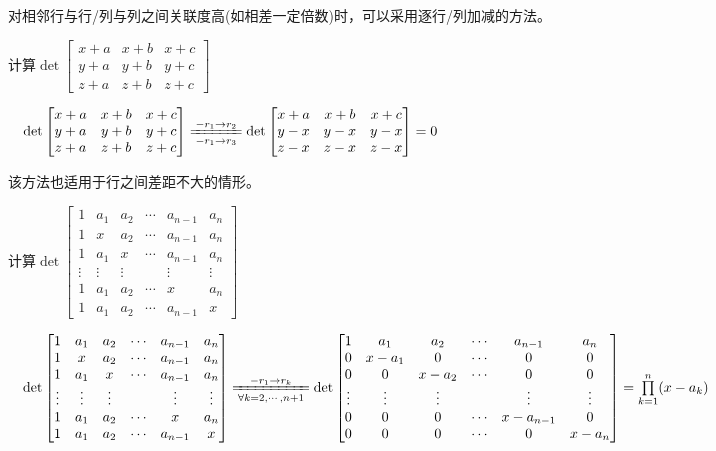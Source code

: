                 对相邻行与行/列与列之间关联度高(如相差一定倍数)时，可以采用逐行/列加减的方法。

                \begin{example}
                    计算$\det\begin{bmatrix}x+a&x+b&x+c\\y+a&y+b&y+c\\z+a&z+b&z+c\end{bmatrix}$
                \end{example}

                \begin{solution}
                    $\quad\det\begin{bmatrix}x+a&x+b&x+c\\y+a&y+b&y+c\\z+a&z+b&z+c\end{bmatrix}\xlongequal[-r_1\rightarrow r_3]{-r_1\rightarrow r_2}\det\begin{bmatrix}x+a&x+b&x+c\\y-x&y-x&y-x\\z-x&z-x&z-x\end{bmatrix}=0$
                \end{solution}

                该方法也适用于行之间差距不大的情形。

                \begin{example}
                    计算$\det\begin{bmatrix}1&a_1&a_2&\cdots&a_{n-1}&a_n\\1&x&a_2&\cdots&a_{n-1}&a_{n}\\1&a_1&x&\cdots&a_{n-1}&a_n\\\vdots&\vdots&\vdots&&\vdots&\vdots\\1&a_1&a_2&\cdots&x&a_n\\1&a_1&a_2&\cdots&a_{n-1}&x\end{bmatrix}$
                \end{example}

                \begin{solution}
                    $\quad\det\begin{bmatrix}1&a_1&a_2&\cdots&a_{n-1}&a_n\\1&x&a_2&\cdots&a_{n-1}&a_{n}\\1&a_1&x&\cdots&a_{n-1}&a_n\\\vdots&\vdots&\vdots&&\vdots&\vdots\\1&a_1&a_2&\cdots&x&a_n\\1&a_1&a_2&\cdots&a_{n-1}&x\end{bmatrix}\xlongequal[\forall k=2,\cdots,n+1]{-r_1\rightarrow r_k}\det\begin{bmatrix}1&a_1&a_2&\cdots&a_{n-1}&a_n\\0&x-a_1&0&\cdots&0&0\\0&0&x-a_2&\cdots&0&0\\\vdots&\vdots&\vdots&&\vdots&\vdots\\0&0&0&\cdots&x-a_{n-1}&0\\0&0&0&\cdots&0&x-a_n\end{bmatrix}=\prod\limits_{k=1}^{n}(x-a_k)$
                \end{solution}

